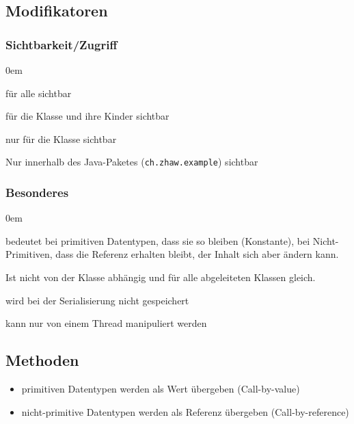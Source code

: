 \subsection{Modifikatoren}
\subsubsection{Sichtbarkeit/Zugriff}
\begin{description}\itemsep0em
	\item [public] für alle sichtbar
	\item [protected] für die Klasse und ihre Kinder sichtbar
	\item [private] nur für die Klasse sichtbar
	\item [ohne Bezeichner] Nur innerhalb des Java-Paketes (\texttt{ch.zhaw.example}) sichtbar
\end{description}

\subsubsection{Besonderes}
\begin{description}\itemsep0em
	\item[final] 
	bedeutet bei primitiven Datentypen, dass sie so bleiben (Konstante), bei Nicht-Primitiven, dass die Referenz erhalten bleibt, der Inhalt sich aber ändern kann.\\
	\item[static] 
	Ist nicht von der Klasse abhängig und für alle abgeleiteten Klassen gleich.\\

	\item [transient] 
	wird bei der Serialisierung nicht gespeichert
	
	\item [synchronized] 
	kann nur von einem Thread manipuliert werden
\end{description}

\subsection{Methoden}
\begin{itemize}\itemsep0em
	\item primitiven Datentypen werden als Wert übergeben (Call-by-value)
	\item nicht-primitive Datentypen werden als Referenz übergeben (Call-by-reference)
\end{itemize}


